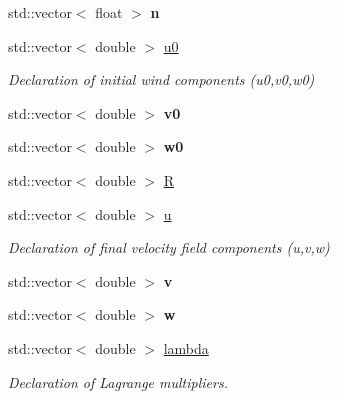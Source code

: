 \begin{DoxyCompactItemize}
std\+::vector$<$ float $>$ {\bfseries n}
\item 
\mbox{\label{classSolver_aaf60f18219d1d08959b9a6fa209d5e17}} 
std\+::vector$<$ double $>$ \hyperlink{classSolver_aaf60f18219d1d08959b9a6fa209d5e17}{u0}
\begin{DoxyCompactList}\small\item\em Declaration of initial wind components (u0,v0,w0) \end{DoxyCompactList}\item 
\mbox{\label{classSolver_ac5900dc7c2afdaaea09fbadb1e415276}} 
std\+::vector$<$ double $>$ {\bfseries v0}
\item 
\mbox{\label{classSolver_afcf2572409568d3056b396a4b3ceae54}} 
std\+::vector$<$ double $>$ {\bfseries w0}
\item 
std\+::vector$<$ double $>$ \hyperlink{classSolver_aaca74be9e1a11be0c7a480c4202670e7}{R}
\item 
\mbox{\label{classSolver_a4ef34a205c0f10ac6aebe746865c5560}} 
std\+::vector$<$ double $>$ \hyperlink{classSolver_a4ef34a205c0f10ac6aebe746865c5560}{u}
\begin{DoxyCompactList}\small\item\em Declaration of final velocity field components (u,v,w) \end{DoxyCompactList}\item 
\mbox{\label{classSolver_ae0521e44d6759661ee87b8cad4d8880c}} 
std\+::vector$<$ double $>$ {\bfseries v}
\item 
\mbox{\label{classSolver_afab3c620a5ee2755f725347a834d8689}} 
std\+::vector$<$ double $>$ {\bfseries w}
\item 
\mbox{\label{classSolver_a7cbf1a351c061c4d33e977ae95e246ef}} 
std\+::vector$<$ double $>$ \hyperlink{classSolver_a7cbf1a351c061c4d33e977ae95e246ef}{lambda}
\begin{DoxyCompactList}\small\item\em Declaration of Lagrange multipliers. \end{DoxyCompactList}\item 
\mbox{\label{classSolver_a479deb1cb4d561d0389fc9d14aa0fc0d}} 

\end{DoxyCompactItemize}
